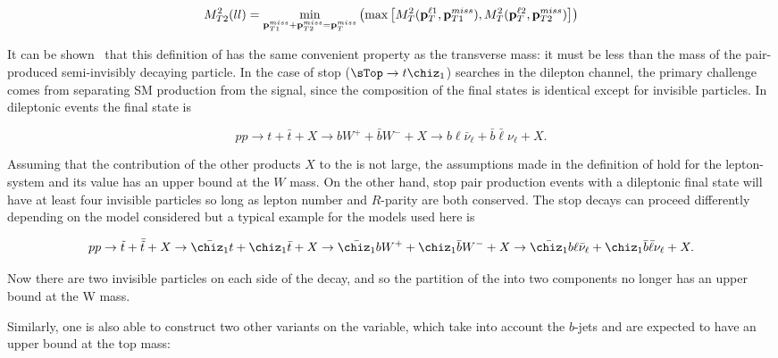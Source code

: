   \begin{equation}
    \label{eq:mt2ll}
    M_{T2}^2(ll) = \min_{\mathbf{p}_{T1}^{miss} + \mathbf{p}_{T2}^{miss} = \mathbf{p}_T^{miss}} \left( \max \left[ M_{T}^2(\mathbf{p}_T^{\ell1},\mathbf{p}_{T1}^{miss}) , M_{T}^2(\mathbf{p}_T^{\ell2},\mathbf{p}_{T2}^{miss}) \right] \right)
  \end{equation}

  It can be shown~\cite{Lester:1999tx} that this definition of \mtll has the same convenient property as the transverse mass: 
  it must be less than the mass of the pair-produced semi-invisibly decaying particle.
  In the case of stop ($\sTop \to t\chiz_1$) searches in the dilepton channel, the primary challenge comes from separating SM \ttbar 
  production from the signal, since the composition of the final states is identical except
  for invisible particles. In dileptonic \ttbar events the final state is

  \begin{equation*}
    pp \to t + \bar{t} + X \to bW^+ + \bar{b}W^- + X \to b\ell\bar{\nu}_\ell + \bar{b}\bar{\ell}\nu_\ell + X.  
  \end{equation*}

  Assuming that the contribution of the other products $X$ to the \met is not large, the assumptions
  made in the definition of \mtll hold for the lepton-\met system and its value has an upper
  bound at the $W$ mass. On the other hand, stop pair production events with a dileptonic final
  state will have at least four invisible particles so long as lepton number and $R$-parity are both
  conserved. The stop decays can proceed differently depending on the model considered but a
  typical example for the models used here is

  \begin{equation*}
    pp \to \tilde{t} + \bar{\tilde{t}} + X \to \bar{\chiz_1}t + \chiz_1\bar{t} + X \to \bar{\chiz_1}bW^+ + \chiz_1\bar{b}W^- + X \to \bar{\chiz_1}b\ell\bar{\nu}_\ell + \chiz_1\bar{b}\bar{\ell}\nu_\ell + X.  
  \end{equation*}

  Now there are
  two invisible particles on each side of the decay, and so the partition of the
  \met into two components no longer has an upper bound at the W mass.

  Similarly, one is also able to construct two other variants on the \mtll variable, which take into account the $b$-jets and are expected to have an upper bound at the top mass:

